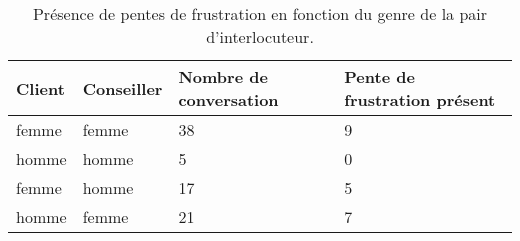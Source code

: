 \begin{table}[]
\centering
\begin{tabular}{|l l|l|l|}
 \hline
 Client	&Conseiller	&Nombre de conversation	&Pente de frustration présent \\
 \hline
femme	&femme	&38	&9	\\
homme	&homme	&5	&0	\\
femme	&homme	&17	&5	\\
homme	&femme	&21	&7	\\
 \hline
\end{tabular}
\caption{Présence de pentes de frustration en fonction du genre de la pair d'interlocuteur.}
\label{tab:genre}
\end{table}
